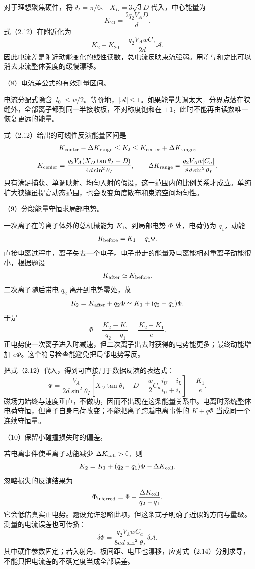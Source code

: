 \documentclass[12pt,a4paper,fontset=fandol]{ctexart}
\begin{document}
对于理想聚焦硬件，将 \(\theta_I=\pi/6\)、 \(X_D=3\sqrt3D\)
代入，中心能量为 \[
K_{20}=\frac{2q_2V_AD}{d}.
\] 式（2.12）在附近化为 \[
K_2-K_{20}=\frac{q_2V_AwC_a}{2d}\mathcal A.
\]
因此电流差是附近动能变化的线性读数，总电流反映束流强弱。用差与和之比可以消去束流整体强度的缓慢漂移。

（8）电流差公式的有效测量区间。

电流分配式隐含
\(|l_0|\le w/2\)。等价地，\(|\mathcal A|\le1\)。如果能量失调太大，分界点落在狭缝外，全部离子都到同一半接收板，不对称度饱和在
\(\pm1\)，此时不能再由读数唯一恢复更远的能量。

式（2.12）给出的可线性反演能量区间是 \[
K_{\rm center}-\Delta K_{\rm range}
\le K_2\le
K_{\rm center}+\Delta K_{\rm range},
\] \[
K_{\rm center}=
\frac{q_2V_A(X_D\tan\theta_I-D)}{4d\sin^2\theta_I},
\qquad
\Delta K_{\rm range}=
\frac{q_2V_Aw|C_a|}{8d\sin^2\theta_I}.
\]
只有满足捕获、单调映射、均匀入射的假设，这一范围内的比例关系才成立。单纯扩大狭缝虽提高动态范围，也会改变角度散布和束流空间均匀性。

（9）分段能量守恒求局部电势。

一次离子在等离子体外的总机械能为 \(K_1\)。到局部电势 \(\Phi\)
处，电荷仍为 \(q_1\)，动能 \[
K_{\rm before}=K_1-q_1\Phi.
\]
直接电离过程中，离子失去一个电子。电子带走的能量及电离能相对重离子动能很小，根据题设
\[
K_{\rm after}\simeq K_{\rm before}.
\] 二次离子随后带电 \(q_2\) 离开到电势零处，故 \[
K_2=K_{\rm after}+q_2\Phi
\simeq K_1+(q_2-q_1)\Phi.
\] 于是 \[
\boxed{\Phi=\frac{K_2-K_1}{q_2-q_1}
=\frac{K_2-K_1}{e}.}\tag{2.13}
\]
正电势使一次离子进入时减速，但二次离子出去时获得的电势能更多；最终动能增加
\(e\Phi\)。这个符号检查能避免把局部电势写反。

把式（2.12）代入，得到可直接用于数据反演的表达式： \[
\boxed{
\Phi=\frac{V_A}{2d\sin^2\theta_I}
\left[X_D\tan\theta_I-D+\frac w2C_a
\frac{i_U-i_L}{i_U+i_L}\right]
-\frac{K_1}{e}.}\tag{2.14}
\]
磁场力始终与速度垂直，不做功，因而不出现在这条能量关系中。电离时系统整体电荷守恒，但离子自身电荷改变；不能把离子跨越电离事件的
\(K+q\Phi\) 当成同一个连续守恒量。

（10）保留小碰撞损失时的偏差。

若电离事件使重离子动能减少 \(\Delta K_{\rm coll}>0\)，则 \[
K_2=K_1+(q_2-q_1)\Phi-\Delta K_{\rm coll}.
\] 忽略损失的反演结果为 \[
\Phi_{\rm inferred}
=\Phi-\frac{\Delta K_{\rm coll}}{q_2-q_1}.
\]
它会低估真实正电势。题设允许忽略此项，但这条式子明确了近似的方向与量级。测量的电流误差也可传播：
\[
\delta\Phi=
\frac{q_2V_AwC_a}
{8ed\sin^2\theta_I}\,\delta\mathcal A.
\]
其中硬件参数固定；若入射角、板间距、电压也漂移，应对式（2.14）分别求导，不能只把电流差的不确定度当成全部误差。
\end{document}
